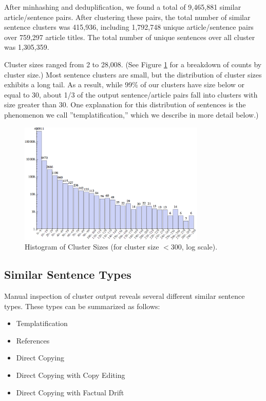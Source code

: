 \documentclass{acm_proc_article-sp}
\begin{document}
After minhashing and deduplification, we found a total of 9,465,881 similar article/sentence pairs. After clustering these pairs, the total number of similar sentence clusters was 415,936, including 1,792,748 unique article/sentence pairs over 759,297 article titles. The total number of unique sentences over all cluster was 1,305,359.

Cluster sizes ranged from 2 to 28,008. (See Figure \ref{clust} for a breakdown of counts by cluster size.) Most sentence clusters are small, but the distribution of cluster sizes exhibits a long tail. As a result, while 99\% of our clusters have size below or equal to 30, about 1/3 of the output sentence/article pairs fall into clusters with size greater than 30. One explanation for this distribution of sentences is the phenomenon we call ''templatification,'' which we describe in more detail below.)

\begin{figure}
\centering
\includegraphics[width=3.5in, keepaspectratio = true]{clusterhistogram.png}
\caption{Histogram of Cluster Sizes (for cluster size $< 300$, log scale).}
\label{clust}
\end{figure}

\subsection{Similar Sentence Types}

Manual inspection of cluster output reveals several different similar sentence types. These types can be summarized as follows:

\begin{itemize}
\item Templatification
\item References
\item Direct Copying
\item Direct Copying with Copy Editing
\item Direct Copying with Factual Drift
\end{itemize}
\end{document}
